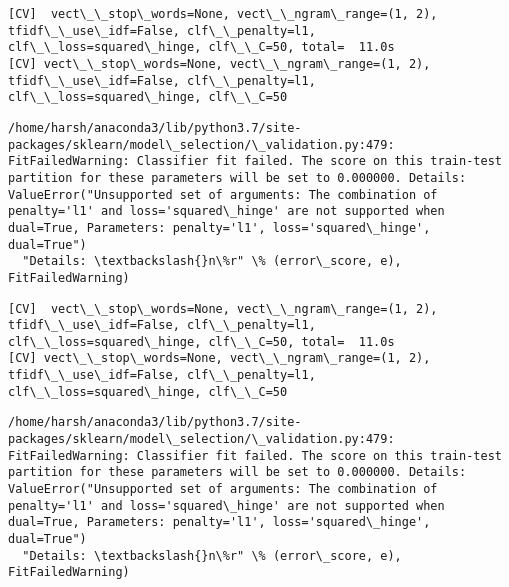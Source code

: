 \documentclass[11pt]{article}
\begin{document}
    \begin{Verbatim}[commandchars=\\\{\}]
[CV]  vect\_\_stop\_words=None, vect\_\_ngram\_range=(1, 2), tfidf\_\_use\_idf=False, clf\_\_penalty=l1, clf\_\_loss=squared\_hinge, clf\_\_C=50, total=  11.0s
[CV] vect\_\_stop\_words=None, vect\_\_ngram\_range=(1, 2), tfidf\_\_use\_idf=False, clf\_\_penalty=l1, clf\_\_loss=squared\_hinge, clf\_\_C=50 

    \end{Verbatim}

    \begin{Verbatim}[commandchars=\\\{\}]
/home/harsh/anaconda3/lib/python3.7/site-packages/sklearn/model\_selection/\_validation.py:479: FitFailedWarning: Classifier fit failed. The score on this train-test partition for these parameters will be set to 0.000000. Details: 
ValueError("Unsupported set of arguments: The combination of penalty='l1' and loss='squared\_hinge' are not supported when dual=True, Parameters: penalty='l1', loss='squared\_hinge', dual=True")
  "Details: \textbackslash{}n\%r" \% (error\_score, e), FitFailedWarning)

    \end{Verbatim}

    \begin{Verbatim}[commandchars=\\\{\}]
[CV]  vect\_\_stop\_words=None, vect\_\_ngram\_range=(1, 2), tfidf\_\_use\_idf=False, clf\_\_penalty=l1, clf\_\_loss=squared\_hinge, clf\_\_C=50, total=  11.0s
[CV] vect\_\_stop\_words=None, vect\_\_ngram\_range=(1, 2), tfidf\_\_use\_idf=False, clf\_\_penalty=l1, clf\_\_loss=squared\_hinge, clf\_\_C=50 

    \end{Verbatim}

    \begin{Verbatim}[commandchars=\\\{\}]
/home/harsh/anaconda3/lib/python3.7/site-packages/sklearn/model\_selection/\_validation.py:479: FitFailedWarning: Classifier fit failed. The score on this train-test partition for these parameters will be set to 0.000000. Details: 
ValueError("Unsupported set of arguments: The combination of penalty='l1' and loss='squared\_hinge' are not supported when dual=True, Parameters: penalty='l1', loss='squared\_hinge', dual=True")
  "Details: \textbackslash{}n\%r" \% (error\_score, e), FitFailedWarning)

    \end{Verbatim}
\end{document}
